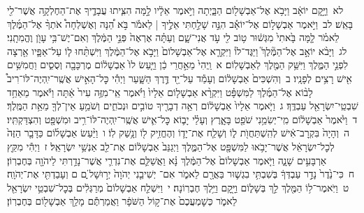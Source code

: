 \documentclass[18pt]{article}
\newcommand{\vart}[1]{\Bfootnote{#1}}	%
\newcommand{\kri}[1]{\Afootnote{#1}}	%
\begin{document}
 {\loc לא~}וַיָּ֣קׇם יוֹאָ֔ב וַיָּבֹ֥א אֶל־אַבְשָׁל֖וֹם הַבָּ֑יְתָה וַיֹּ֣אמֶר אֵלָ֔יו לָ֣מָּה הִצִּ֧יתוּ עֲבָדֶ֛יךָ אֶת־הַחֶלְקָ֥ה אֲשֶׁר־לִ֖י בָּאֵֽשׁ׃ \startlock
 {\loc לב~}וַיֹּ֣אמֶר אַבְשָׁל֣וֹם אֶל־יוֹאָ֡ב הִנֵּ֣ה שָׁלַ֣חְתִּי אֵלֶ֣יךָ  |  לֵאמֹ֡ר בֹּ֣א הֵ֠נָּה וְאֶשְׁלְחָה֩ אֹתְךָ֨ אֶל־הַמֶּ֜לֶךְ לֵאמֹ֗ר לָ֤מָּה בָּ֙אתִי֙ מִגְּשׁ֔וּר ט֥וֹב לִ֖י עֹ֣ד אֲנִי־שָׁ֑ם וְעַתָּ֗ה אֶרְאֶה֙ פְּנֵ֣י הַמֶּ֔לֶךְ וְאִם־יֶשׁ־בִּ֥י עָוֺ֖ן וֶהֱמִתָֽנִי׃ \startlock
 {\loc לג~}וַיָּבֹ֨א יוֹאָ֣ב אֶל־הַמֶּ֘לֶךְ֮ וַיַּגֶּד־לוֹ֒ וַיִּקְרָ֤א אֶל־אַבְשָׁלוֹם֙ וַיָּבֹ֣א אֶל־הַמֶּ֔לֶךְ וַיִּשְׁתַּ֨חוּ ל֧וֹ עַל־אַפָּ֛יו אַ֖רְצָה לִפְנֵ֣י הַמֶּ֑לֶךְ וַיִּשַּׁ֥ק הַמֶּ֖לֶךְ לְאַבְשָׁלֽוֹם׃ 
\startlock
 {\loc א~}וַֽיְהִי֙ מֵאַ֣חֲרֵי כֵ֔ן וַיַּ֤עַשׂ לוֹ֙ אַבְשָׁל֔וֹם מֶרְכָּבָ֖ה וְסֻסִ֑ים וַחֲמִשִּׁ֥ים אִ֖ישׁ רָצִ֥ים לְפָנָֽיו׃ \startlock
 {\loc ב~}וְהִשְׁכִּים֙ אַבְשָׁל֔וֹם וְעָמַ֕ד עַל־יַ֖ד דֶּ֣רֶךְ הַשָּׁ֑עַר וַיְהִ֡י כׇּל־הָאִ֣ישׁ אֲשֶֽׁר־יִֽהְיֶה־לּוֹ־רִיב֩ לָב֨וֹא אֶל־הַמֶּ֜לֶךְ לַמִּשְׁפָּ֗ט וַיִּקְרָ֨א אַבְשָׁל֤וֹם אֵלָיו֙ וַיֹּ֗אמֶר אֵֽי־מִזֶּ֥ה עִיר֙ אַ֔תָּה וַיֹּ֕אמֶר מֵאַחַ֥ד שִׁבְטֵֽי־יִשְׂרָאֵ֖ל עַבְדֶּֽךָ׃ \startlock
 {\loc ג~}וַיֹּ֤אמֶר אֵלָיו֙ אַבְשָׁל֔וֹם רְאֵ֥ה דְבָרֶ֖יךָ טוֹבִ֣ים וּנְכֹחִ֑ים וְשֹׁמֵ֥עַ אֵין־לְךָ֖ מֵאֵ֥ת הַמֶּֽלֶךְ׃ \startlock
 {\loc ד~}וַיֹּ֙אמֶר֙ אַבְשָׁל֔וֹם מִֽי־יְשִׂמֵ֥נִי שֹׁפֵ֖ט בָּאָ֑רֶץ וְעָלַ֗י יָב֛וֹא כׇּל־אִ֛ישׁ אֲשֶֽׁר־יִֽהְיֶה־לּוֹ־רִ֥יב וּמִשְׁפָּ֖ט וְהִצְדַּקְתִּֽיו׃ \startlock
 {\loc ה~}וְהָיָה֙ בִּקְרׇב־אִ֔ישׁ לְהִֽשְׁתַּחֲוֺ֖ת ל֑וֹ וְשָׁלַ֧ח אֶת־יָד֛וֹ וְהֶחֱזִ֥יק ל֖וֹ וְנָ֥שַׁק לֽוֹ׃ \startlock
 {\loc ו~}וַיַּ֨עַשׂ אַבְשָׁל֜וֹם כַּדָּבָ֤ר הַזֶּה֙ לְכׇל־יִשְׂרָאֵ֔ל אֲשֶׁר־יָבֹ֥אוּ לַמִּשְׁפָּ֖ט אֶל־הַמֶּ֑לֶךְ וַיְגַנֵּב֙ אַבְשָׁל֔וֹם אֶת־לֵ֖ב אַנְשֵׁ֥י יִשְׂרָאֵֽל׃ \startlock
 {\loc ז~}וַיְהִ֕י מִקֵּ֖ץ אַרְבָּעִ֣ים שָׁנָ֑ה וַיֹּ֤אמֶר אַבְשָׁלוֹם֙ אֶל־הַמֶּ֔לֶךְ  \edtext{אֵ֣לְכָה}{\vart{א=אֵ֣לֲכָה | }}  נָּ֗א וַאֲשַׁלֵּ֛ם אֶת־נִדְרִ֛י אֲשֶׁר־נָדַ֥רְתִּי לַיהֹוָ֖ה בְּחֶבְרֽוֹן׃ \startlock
 {\loc ח~}כִּי־נֵ֙דֶר֙ נָדַ֣ר עַבְדְּךָ֔ בְּשִׁבְתִּ֥י בִגְשׁ֛וּר בַּאֲרָ֖ם לֵאמֹ֑ר אִם־ \edtext{(ישיב)}{\kri{קרי: יָשׁ֨וֹב}}  יְשִׁיבֵ֤נִי יְהֹוָה֙ יְר֣וּשָׁל ַ֔͏ְם ם וְעָבַדְתִּ֖י אֶת־יְהֹוָֽה׃ \startlock
 {\loc ט~}וַיֹּֽאמֶר־ל֥וֹ הַמֶּ֖לֶךְ לֵ֣ךְ בְּשָׁל֑וֹם וַיָּ֖קׇם וַיֵּ֥לֶךְ חֶבְרֽוֹנָה׃ \startlock
 {\loc י~}וַיִּשְׁלַ֤ח אַבְשָׁלוֹם֙ מְרַגְּלִ֔ים בְּכׇל־שִׁבְטֵ֥י יִשְׂרָאֵ֖ל לֵאמֹ֑ר כְּשׇׁמְעֲכֶם֙ אֶת־ק֣וֹל הַשֹּׁפָ֔ר וַאֲמַרְתֶּ֕ם מָלַ֥ךְ אַבְשָׁל֖וֹם בְּחֶבְרֽוֹן׃ \startlock
\end{document}
